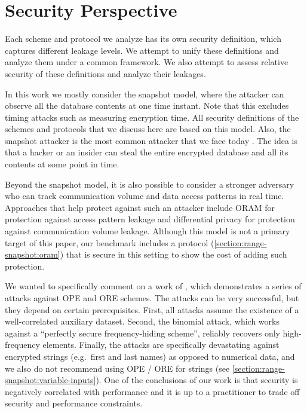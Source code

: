 \section{Security Perspective}\label{section:range-snapshot:security}

	Each scheme and protocol we analyze has its own security definition, which captures different leakage levels.
	We attempt to unify these definitions and analyze them under a common framework.
	We also attempt to assess relative security of these definitions and analyze their leakages.

	In this work we mostly consider the snapshot model, where the attacker can observe all the database contents at one time instant.
	Note that this excludes timing attacks such as measuring encryption time.
	All security definitions of the schemes and protocols that we discuss here are based on this model.
	Also, the snapshot attacker is the most common attacker that we face today \cite{secure-queries-overview}.
	The idea is that a hacker or an insider can steal the entire encrypted database and all its contents at some point in time.

	Beyond the snapshot model, it is also possible to consider a stronger adversary who can track communication volume and data access patterns in real time.
	Approaches that help protect against such an attacker include ORAM for protection against access pattern leakage and differential privacy for protection against communication volume leakage.
	Although this model is not a primary target of this paper, our benchmark includes a protocol (\cref{section:range-snapshot:oram}) that is secure in this setting to show the cost of adding such protection.

	We wanted to specifically comment on a work of \textcite{leakage-abuse-grubs-2017}, which demonstrates a series of attacks against OPE and ORE schemes.
	The attacks can be very successful, but they depend on certain prerequisites.
	First, all attacks assume the existence of a well-correlated auxiliary dataset.
	Second, the binomial attack, which works against a ``perfectly secure frequency-hiding scheme'', reliably recovers only high-frequency elements.
	Finally, the attacks are specifically devastating against encrypted strings (e.g.\ first and last names) as opposed to numerical data, and we also do not recommend using OPE / ORE for strings (see \cref{section:range-snapshot:variable-inputs}).
	One of the conclusions of our work is that security is negatively correlated with performance and it is up to a practitioner to trade off security and performance constraints.

